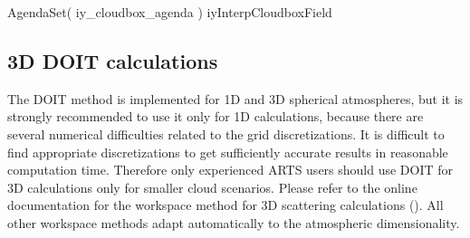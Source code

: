 \begin{code}
AgendaSet( iy_cloudbox_agenda ){
    iyInterpCloudboxField
}
\end{code}

\subsection{3D DOIT calculations}

The DOIT method is implemented for 1D and 3D spherical atmospheres, but it is
strongly recommended to use it only for 1D calculations, because there
are several numerical difficulties related to the grid
discretizations. It is difficult to find appropriate discretizations
to get sufficiently accurate results in reasonable computation
time. Therefore only experienced ARTS users should use DOIT for 3D
calculations only for smaller cloud scenarios. Please refer to the online
documentation for the workspace method for  3D scattering calculations
(). All other workspace
methods adapt automatically to the atmospheric dimensionality.






